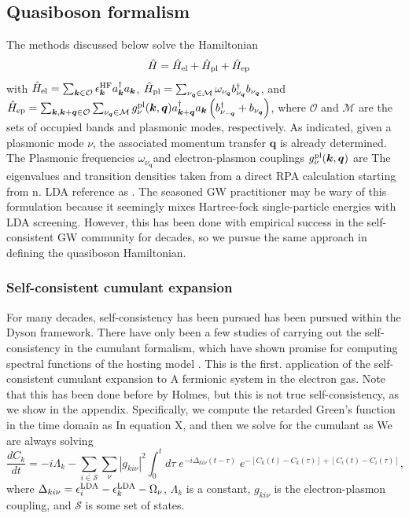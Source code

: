 \documentclass[%
 reprint,
 amsmath,amssymb,
 aps,
]{revtex4-2}
\begin{document}
\subsection{Quasiboson formalism}
The methods discussed below solve the Hamiltonian
\begin{align}
\hat{H}
&=
\hat{H}_{\rm el}
+
\hat{H}_{\rm pl}
+
\hat{H}_{\rm ep}
\end{align}
with $\hat{H}_{\rm el}=  \sum_{\bm{k}\in\mathcal{O}}
\epsilon_{\bm{k}}^{\rm HF}
a_{\bm{k}}^{\dagger}a_{\bm{k}}$, $\hat{H}_{\rm pl}= \sum_{\nu_{\bm{q}}\in\mathcal{M}}
\omega_{\nu_{\bm{q}}}
b_{\nu_{\bm{q}}}^{\dagger}
b_{\nu_{\bm{q}}}$, and $\hat{H}_{\rm ep}= \sum_{\bm{k},\bm{k}+\bm{q}\in\mathcal{O}}
\sum_{\nu_{\bm{q}}\in\mathcal{M}}
g_{\nu}^{\rm pl}(\bm{k},\bm{q})
a_{\bm{k}+\bm{q}}^{\dagger}
a_{\bm{k}}
\left(
b_{\nu_{-\bm{q}}}^{\dagger}
+
b_{\nu_{\bm{q}}}
\right)$, where $\mathcal{O}$ and $\mathcal{M}$ are the sets of occupied bands and plasmonic modes, respectively. As indicated, given a plasmonic mode $\nu$, the associated momentum transfer $\bm{q}$ is already determined. The Plasmonic  frequencies $\omega_{\nu_{\bm{q}}}$and electron-plasmon couplings $g_{\nu}^{\rm pl}(\bm{k},\bm{q})$ are The eigenvalues  and transition densities taken from a direct RPA calculation starting from n. LDA reference as . The seasoned GW practitioner may be wary of this formulation because it seemingly mixes Hartree-fock single-particle energies with LDA screening. However, this has been done with empirical success in the self-consistent GW community for decades, so we pursue the same approach in defining the quasiboson Hamiltonian. 

\subsubsection{Self-consistent cumulant expansion}
For many decades, self-consistency has been pursued has been pursued within the Dyson framework. There have only been a few studies of carrying out the self-consistency in the cumulant formalism, which have shown promise for computing spectral functions of the hosting model . This is the first.  application of the self-consistent cumulant expansion to A fermionic system in the electron gas. Note that this has been done before by Holmes, but this is not true self-consistency, as we show in the appendix.  Specifically, we compute the retarded Green's function in the time domain as In equation X, and then we solve for the cumulant as 
We are always solving
\begin{equation}
\frac{dC_k}{dt}=-i\Lambda_k - \sum_{i\in\mathcal{S}}\sum_\nu|g_{ki\nu}|^2\int_0^t\!d\tau\; e^{-i\Delta_{ki\nu}(t-\tau)}\; e^{-[C_k(t)-C_k(\tau)]+[C_i(t)-C_i(\tau)]},
\end{equation}
where $\Delta_{ki\nu}=\epsilon^{\rm LDA}_i-\epsilon^{\rm LDA}_k-{\Omega_\nu}$, $\Lambda_k$ is a constant, ${g_{ki\nu}}$ is the electron-plasmon coupling, and $\mathcal{S}$ is some set of states.
\end{document}
